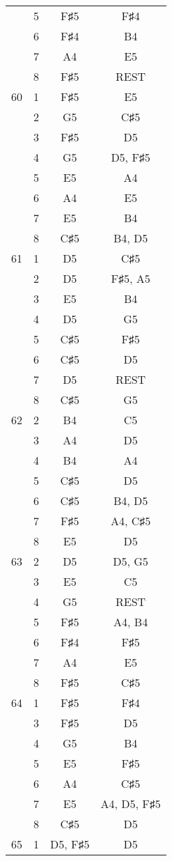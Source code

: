 \documentclass{article}
\begin{document}
\begin{longtable}{|c|c|c|c|}
  & 5 & F♯5 & F♯4 \\ 
  & 6 & F♯4 & B4 \\ 
  & 7 & A4 & E5 \\ 
  & 8 & F♯5 & REST \\ 
\hline
60 & 1 & F♯5 & E5 \\ 
  & 2 & G5 & C♯5 \\ 
  & 3 & F♯5 & D5 \\ 
  & 4 & G5 & D5, F♯5 \\ 
  & 5 & E5 & A4 \\ 
  & 6 & A4 & E5 \\ 
  & 7 & E5 & B4 \\ 
  & 8 & C♯5 & B4, D5 \\ 
\hline
61 & 1 & D5 & C♯5 \\ 
  & 2 & D5 & F♯5, A5 \\ 
  & 3 & E5 & B4 \\ 
  & 4 & D5 & G5 \\ 
  & 5 & C♯5 & F♯5 \\ 
  & 6 & C♯5 & D5 \\ 
  & 7 & D5 & REST \\ 
  & 8 & C♯5 & G5 \\ 
\hline
62 & 2 & B4 & C5 \\ 
  & 3 & A4 & D5 \\ 
  & 4 & B4 & A4 \\ 
  & 5 & C♯5 & D5 \\ 
  & 6 & C♯5 & B4, D5 \\ 
  & 7 & F♯5 & A4, C♯5 \\ 
  & 8 & E5 & D5 \\ 
\hline
63 & 2 & D5 & D5, G5 \\ 
  & 3 & E5 & C5 \\ 
  & 4 & G5 & REST \\ 
  & 5 & F♯5 & A4, B4 \\ 
  & 6 & F♯4 & F♯5 \\ 
  & 7 & A4 & E5 \\ 
  & 8 & F♯5 & C♯5 \\ 
\hline
64 & 1 & F♯5 & F♯4 \\ 
  & 3 & F♯5 & D5 \\ 
  & 4 & G5 & B4 \\ 
  & 5 & E5 & F♯5 \\ 
  & 6 & A4 & C♯5 \\ 
  & 7 & E5 & A4, D5, F♯5 \\ 
  & 8 & C♯5 & D5 \\ 
\hline
65 & 1 & D5, F♯5 & D5 \\ 

\end{longtable}
\end{document}
